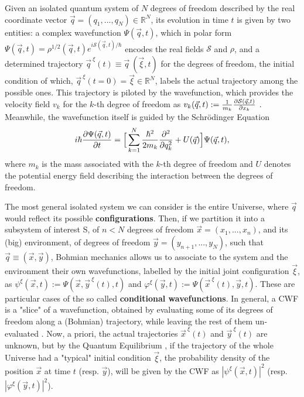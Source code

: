 \documentclass[11pt, a4paper]{article} %
\newcommand{\R}{\mathbb{R}} %
\begin{document}
Given an isolated quantum system of $N$ degrees of freedom described by the real coordinate vector $\vec{q}=(q_1,..., q_N)\in\R^N$, its evolution in time $t$ is given by two entities: a complex wavefunction $\Psi(\vec{q},t)$, which in polar form $\Psi(\vec{q},t)=\rho^{1/2}(\vec{q},t)e^{i\mathcal{S}(\vec{q},t)/\hbar}$ encodes the real fields $\mathcal{S}$ and $\rho$, and a determined trajectory $\vec{q}^{\:\xi}(t)\equiv \vec{q}\:(\vec{\xi},t)$ for the degrees of freedom, the initial condition of which, $\vec{q}^{\:\xi}(t=0)=\vec{\xi}\in \R^N$, labels the actual trajectory among the possible ones. This trajectory is piloted by the wavefunction, which provides the velocity field $v_k$ for the $k$-th degree of freedom as $v_k(\vec{q},t):=\frac{1}{m_k} \pdv{\mathcal{S}(\vec{q},t)}{x_k}$ \cite{Bohm,Holland,Durr,JordiXavier}. Meanwhile, the wavefunction itself is guided by the Schrödinger Equation\vspace{-0.1cm} 
\begin{equation}\label{SE}
i\hbar\pdv{\Psi(\vec{q},t)}{t}=\Big[ \sum_{k=1}^N \frac{\hbar^2}{2m_k}\pdv[2]{}{q_k}+U(\vec{q})\Big]\Psi(\vec{q},t),\vspace{-0.1cm}
\end{equation}
where $m_k$ is the mass associated with the $k$-th degree of freedom and $U$ denotes the potential energy field describing the interaction between the degrees of freedom. 

The most general isolated system we can consider is the entire Universe, where $\vec{q}$ would reflect its possible {\bf configurations}. Then, if we partition it into a subsystem of interest S, of $n<N$ degrees of freedom $\vec{x}=(x_1,...,x_n)$, and its (big) environment, of degrees of freedom $\vec{y}=(y_{n+1},...,y_N)$, such that $\vec{q}\equiv (\vec{x},\vec{y})$, Bohmian mechanics allows us to associate to the system and the environment their own wavefunctions, labelled by the initial joint configuration $\vec{\xi}$, as $\psi^\xi(\vec{x},t):=\Psi(\vec{x},\vec{y}^{\:\xi}(t),t)$ and $\varphi^\xi(\vec{y},t):=\Psi(\vec{x}^{\:\xi}(t),\vec{y},t)$. These are particular cases of the so called {\bf conditional wavefunctions}. In general, a CWF is a "slice" of a wavefunction, obtained by evaluating some of its degrees of freedom along a (Bohmian) trajectory, while leaving the rest of them un-evaluated \cite{Absolute, JordiXavier}. Now, a priori, the actual trajectories $\vec{x}^{\:\xi}(t)$ and $\vec{y}^{\:\xi}(t)$ are unknown, but by the Quantum Equilibrium \cite{Absolute}, if the trajectory of the whole Universe had a "typical" initial condition $\vec{\xi}$, the probability density of the position $\vec{x}$ at time $t$ (resp. $\vec{y}$), will be given by the CWF as $|\psi^\xi(\vec{x},t)|^2$ (resp. $|\varphi^\xi(\vec{y},t)|^2$).
\end{document}
